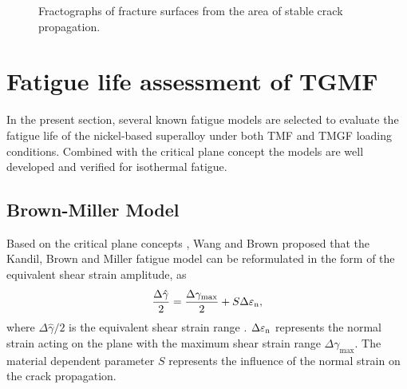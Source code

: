 \documentclass[preprint,5p,twocolumn,11pt,sort&compress]{elsarticle}
\begin{document}
\begin{figure}[htbp]
  \caption{Fractographs of fracture surfaces from the area of stable crack propagation.}
  \label{Fig:fatigue_striations_TGMF}
\end{figure}

\newpage
\section{Fatigue life assessment of TGMF}

In the present section, several known fatigue models are selected to evaluate the fatigue life of the nickel-based superalloy under both TMF and TMGF loading conditions. Combined with the critical plane concept the models are well developed and verified for isothermal fatigue.

\subsection{Brown-Miller Model}
Based on the critical plane concepts \cite{Brown2006}, Wang and Brown \cite{Wang1993} proposed that the Kandil, Brown and Miller fatigue model \cite{Kandil1982} can be reformulated in the form of the equivalent shear strain amplitude, as
\begin{equation}
\frac{{\Delta \hat \gamma }}{2} = \frac{{\Delta {\gamma _{\max}}}}{2} + S\Delta {\varepsilon _{\rm n}},
\label{Equ:ShearStrainBM}
\end{equation}
where ${{\Delta \hat \gamma }}/{2}$ is the equivalent shear strain range \cite{Wang1993}. $\Delta {\varepsilon _{\rm n}}$ represents the normal strain acting on the plane with the maximum shear strain range $\Delta {\gamma _{\max}}$. The material dependent parameter $S$ represents the influence of the normal strain on the crack propagation.
\end{document}
